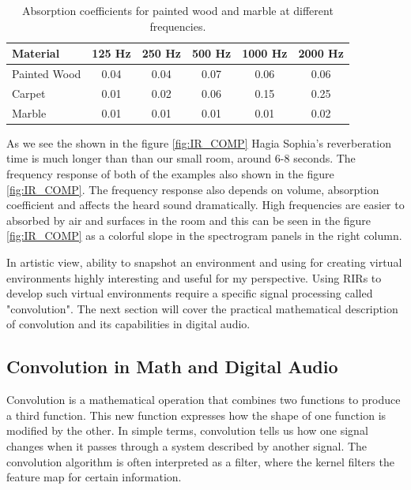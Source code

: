             \begin{table}[h!]
                \centering
                \begin{tabular}{|l|c|c|c|c|c|}
                \hline
                Material & 125 Hz & 250 Hz & 500 Hz & 1000 Hz & 2000 Hz \\
                \hline
                Painted Wood & 0.04 & 0.04 & 0.07 & 0.06 & 0.06 \\
                Carpet       & 0.01 & 0.02 & 0.06 & 0.15 & 0.25 \\
                Marble       & 0.01 & 0.01 & 0.01 & 0.01 & 0.02 \\
                \hline
                \end{tabular}
                \caption{Absorption coefficients for painted wood and marble at different frequencies\cite{Absoption_Coefficient_Table}.}
                \label{tab:COEFF}
            \end{table}

            As we see the shown in the figure \ref{fig:IR_COMP} Hagia Sophia's reverberation time is much longer than than our small room, around 6-8 seconds. The frequency response of both of the examples also shown in the figure \ref{fig:IR_COMP}. The frequency response also depends on volume, absorption coefficient and affects the heard sound dramatically. High frequencies are easier to absorbed by air and surfaces\cite{Room_Acoustics} in the room and this can be seen in the figure \ref{fig:IR_COMP} as a colorful slope in the spectrogram panels in the right column.\par

            In artistic view, ability to snapshot an environment and using for creating virtual environments\cite{Recreation_of_the_Acoustics_of_Hagia_Sophia} highly interesting and useful for my perspective. Using RIRs to develop such virtual environments require a specific signal processing called "convolution". The next section will cover the practical mathematical description of convolution and its capabilities in digital audio.
            
        \subsection{Convolution in Math and Digital Audio}
            Convolution is a mathematical operation that combines two functions to produce a third function. This new function expresses how the shape of one function is modified by the other. In simple terms, convolution tells us how one signal changes when it passes through a system described by another signal. The convolution algorithm is often interpreted as a filter, where the kernel filters the feature map for certain information\cite{Deep_Learning_Core_Concepts}.\par

